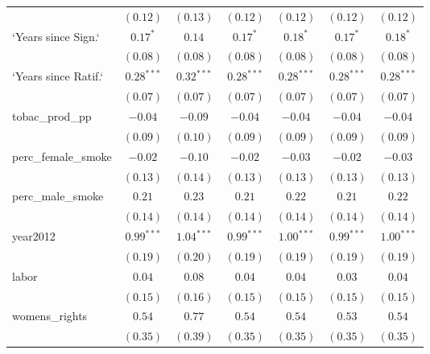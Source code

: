 \begin{table}[!h]
\begin{center}
\begin{tabular}{l c c c c c c }
                        & $(0.12)$     & $(0.13)$      & $(0.12)$     & $(0.12)$     & $(0.12)$     & $(0.12)$     \\
`Years since Sign.`     & $0.17^{*}$   & $0.14$        & $0.17^{*}$   & $0.18^{*}$   & $0.17^{*}$   & $0.18^{*}$   \\
                        & $(0.08)$     & $(0.08)$      & $(0.08)$     & $(0.08)$     & $(0.08)$     & $(0.08)$     \\
`Years since Ratif.`    & $0.28^{***}$ & $0.32^{***}$  & $0.28^{***}$ & $0.28^{***}$ & $0.28^{***}$ & $0.28^{***}$ \\
                        & $(0.07)$     & $(0.07)$      & $(0.07)$     & $(0.07)$     & $(0.07)$     & $(0.07)$     \\
tobac\_prod\_pp         & $-0.04$      & $-0.09$       & $-0.04$      & $-0.04$      & $-0.04$      & $-0.04$      \\
                        & $(0.09)$     & $(0.10)$      & $(0.09)$     & $(0.09)$     & $(0.09)$     & $(0.09)$     \\
perc\_female\_smoke     & $-0.02$      & $-0.10$       & $-0.02$      & $-0.03$      & $-0.02$      & $-0.03$      \\
                        & $(0.13)$     & $(0.14)$      & $(0.13)$     & $(0.13)$     & $(0.13)$     & $(0.13)$     \\
perc\_male\_smoke       & $0.21$       & $0.23$        & $0.21$       & $0.22$       & $0.21$       & $0.22$       \\
                        & $(0.14)$     & $(0.14)$      & $(0.14)$     & $(0.14)$     & $(0.14)$     & $(0.14)$     \\
year2012                & $0.99^{***}$ & $1.04^{***}$  & $0.99^{***}$ & $1.00^{***}$ & $0.99^{***}$ & $1.00^{***}$ \\
                        & $(0.19)$     & $(0.20)$      & $(0.19)$     & $(0.19)$     & $(0.19)$     & $(0.19)$     \\
labor                   & $0.04$       & $0.08$        & $0.04$       & $0.04$       & $0.03$       & $0.04$       \\
                        & $(0.15)$     & $(0.16)$      & $(0.15)$     & $(0.15)$     & $(0.15)$     & $(0.15)$     \\
womens\_rights          & $0.54$       & $0.77$        & $0.54$       & $0.54$       & $0.53$       & $0.54$       \\
                        & $(0.35)$     & $(0.39)$      & $(0.35)$     & $(0.35)$     & $(0.35)$     & $(0.35)$     \\

\end{tabular}
\end{center}
\end{table}
